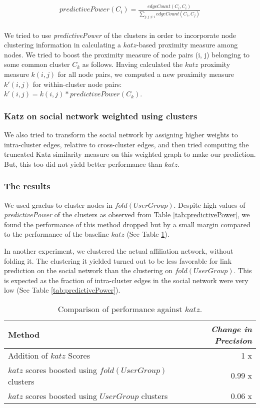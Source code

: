 \documentclass{report}
\begin{document}
\begin{eqnarray*}
predictivePower(C_i) = \frac{edgeCount(C_i, C_i)}{\sum_{j: j \neq i}edgeCount(C_i, C_j)}\\
\end{eqnarray*}


We tried to use \textit{predictivePower} of the clusters in order to incorporate node clustering information in calculating a $katz$-based proximity measure among nodes. We tried to boost the proximity measure of node pairs (i, j) belonging to some common cluster $C_k$ as follows. Having calculated the $katz$ proximity measure $k(i,j)$ for all node pairs, we computed a new proximity measure $k'(i, j)$ for within-cluster node pairs: $k'(i, j) = k(i, j)*predictivePower(C_k)$.

\subsubsection{Katz on social network weighted using clusters}
We also tried to transform the social network by assigning higher weights to intra-cluster edges, relative to cross-cluster edges, and then tried computing the truncated Katz similarity measure on this weighted graph to make our prediction. But, this too did not yield better performance than $katz$.


\subsubsection{The results}
We used graclus to cluster nodes in $fold(UserGroup)$. Despite high values of \textit{predictivePower} of the clusters as observed from Table \ref{tab:predictivePower}, we found the performance of this method dropped but by a small margin compared to the performance of the baseline $katz$ (See Table \ref{tab:methods}).

In another experiment, we clustered the actual affiliation network, without folding it. The clustering it yielded turned out to be less favorable for link prediction on the social network than the clustering on $fold(UserGroup)$. This is expected as the fraction of intra-cluster edges in the social network were very low (See Table \ref{tab:predictivePower}).

\begin{table}
\centering
\begin{tabular}{| p{6cm} |  r |}
\hline
 Method & \textit{Change in Precision}\\[1ex]
\hline
 Addition of $katz$ Scores & 1 x\\
\hline
 $katz$ scores boosted using $fold(UserGroup)$ clusters& 0.99 x\\
\hline
 $katz$ scores boosted using $UserGroup$ clusters& 0.06 x \\
\hline
\end{tabular}
\caption{Comparison of performance against $katz$.}
\label{tab:methods}
\end{table} 
\end{document}
